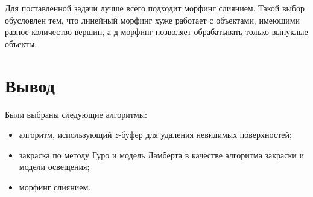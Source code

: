 Для поставленной задачи лучше всего подходит морфинг слиянием. Такой выбор обусловлен тем, что линейный морфинг хуже работает с объектами, имеющими разное количество вершин, а д-морфинг позволяет обрабатывать только выпуклые объекты.

\section*{Вывод}
Были выбраны следующие алгоритмы:
\begin{itemize}[label*=---]
	\item алгоритм, использующий $z$-буфер для удаления невидимых поверхностей;
	\item закраска по методу Гуро и модель Ламберта в качестве алгоритма закраски и модели освещения;
	\item морфинг слиянием.
\end{itemize}
